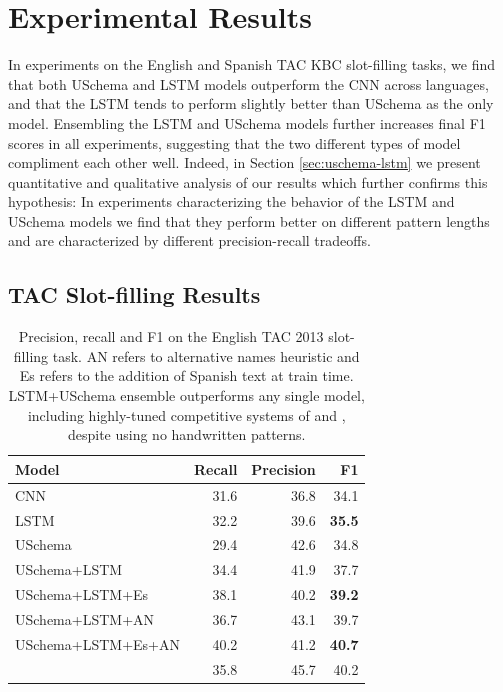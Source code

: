 \section{Experimental Results\label{sec:results}}

In experiments on the English and Spanish TAC KBC slot-filling tasks, we find that both USchema and LSTM models outperform the CNN across languages, and that the LSTM tends to perform slightly better than USchema as the only model. Ensembling the LSTM and USchema models further increases final F1 scores in all experiments, suggesting that the two different types of model compliment each other well. Indeed, in Section \ref{sec:uschema-lstm} we present quantitative and qualitative analysis of our results which further confirms this hypothesis: In experiments characterizing the behavior of the LSTM and USchema models we find that they perform better on different pattern lengths and are characterized by different precision-recall tradeoffs.

\subsection {TAC Slot-filling Results}


\begin{table}[t!]
\setlength{\tabcolsep}{4.1pt}
\begin{center}
\begin{tabular}{|lrrr|}
\hline
\bf Model & \bf Recall & \bf Precision & \bf F1 \\
\hline\hline
CNN                 & 31.6 & 36.8 & 34.1 \\
LSTM                & 32.2 & 39.6 & \bf 35.5  \\
USchema             & 29.4 & 42.6 & 34.8 \\
\hline\hline
USchema+LSTM        & 34.4 & 41.9 & 37.7 \\
USchema+LSTM+Es        & 38.1 & 40.2 & \bf 39.2 \\
\hline\hline
USchema+LSTM+AN	& 36.7 & 43.1 & 39.7 \\
USchema+LSTM+Es+AN & 40.2 & 41.2 & \bf 40.7 \\
\citet{roth2014relationfactory} & 35.8 & 45.7 & 40.2 \\

\hline
\end{tabular}
\caption{Precision, recall and F1 on the English TAC 2013 slot-filling task. AN refers to alternative names heuristic and Es refers to the addition of Spanish text at train time. LSTM+USchema ensemble outperforms any single model, including highly-tuned competitive systems of \protect\citet{roth2014relationfactory} and \protect\citet{angeli2014stanford}, despite using no handwritten patterns.  %
\label{en-tac-table}}
\end{center}
\end{table}

